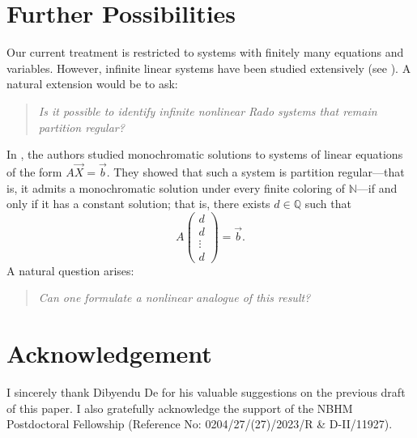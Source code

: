 \documentclass{article}
\theoremstyle{Theorem}
\theoremstyle{definition}
\begin{document}
\section{Further Possibilities}



Our current treatment is restricted to systems with finitely many equations and variables. However, infinite linear systems have been studied extensively (see \cite{new1}). A natural extension would be to ask:

\begin{quote}
    \textit{Is it possible to identify infinite nonlinear Rado systems that remain partition regular?}
\end{quote}

   In \cite{HL06, HM}, the authors studied monochromatic solutions to systems of linear equations of the form \( A\vec{X} = \vec{b} \). They showed that such a system is partition regular—that is, it admits a monochromatic solution under every finite coloring of \( \mathbb{N} \)—if and only if it has a constant solution; that is, there exists \( d \in \mathbb{Q} \) such that  
\[
A \begin{pmatrix}
d \\
d \\
\vdots \\
d
\end{pmatrix} = \vec{b}.
\]  
A natural question arises: 

\begin{quote}
{\it Can one formulate a nonlinear analogue of this result?}
\end{quote}




\section*{Acknowledgement}  I sincerely thank Dibyendu De for his valuable suggestions on the previous draft of this paper. I also gratefully acknowledge the support of the NBHM Postdoctoral Fellowship (Reference No: 0204/27/(27)/2023/R \& D-II/11927).   
\end{document}
